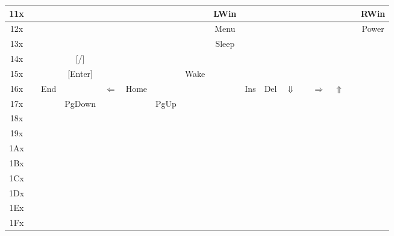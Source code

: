 \begin{landscape}
\begin{center}
\begin{tabular}{ | c | c | c | c | c | c | c | c | c | c | c | c | c | c | c | c | c | }
        \hline
        11x & & & & & & & & LWin & & & & & & & & RWin\\
        \hline
        12x & & & & & & & & Menu & & & & & & & & Power\\
        \hline
        13x & & & & & & & & Sleep & & & & & & & &\\
        \hline
        14x & & & [/] & & & & & & & & & & & & &\\
        \hline
        15x & & & [Enter] & & & & Wake & & & & & & & & &\\
        \hline
        16x & & End & & $\Leftarrow$ & Home & & & & Ins & Del & $\Downarrow$ & & $\Rightarrow$ & $\Uparrow$ & &\\
        \hline
        17x & & & PgDown & & & PgUp & & & & & & & & & &\\
        \hline
        18x & & & & & & & & & & & & & & & &\\
        \hline
        19x & & & & & & & & & & & & & & & &\\
        \hline
        1Ax & & & & & & & & & & & & & & & &\\
        \hline
        1Bx & & & & & & & & & & & & & & & &\\
        \hline
        1Cx & & & & & & & & & & & & & & & &\\
        \hline
        1Dx & & & & & & & & & & & & & & & &\\
        \hline
        1Ex & & & & & & & & & & & & & & & &\\
        \hline
        1Fx & & & & & & & & & & & & & & & &\\
        \hline
    \end{tabular}
  \end{center}
\end{landscape}
